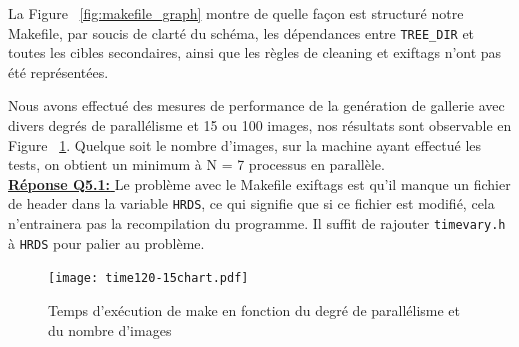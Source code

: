 \documentclass[10.9pt]{article}
\begin{document}
La Figure ~\ref{fig:makefile_graph} montre de quelle façon est
structuré notre Makefile, par soucis de clarté du schéma, les dépendances entre
\lstinline!TREE_DIR! et toutes les cibles secondaires, ainsi que les
règles de cleaning et exiftags n'ont pas été représentées.

Nous avons effectué des mesures de performance de la genération de
gallerie avec divers degrés de parallélisme et 15 ou 100 images, nos
résultats sont observable en Figure ~\ref{fig:time_graph}. 
Quelque soit le nombre d'images, sur la machine ayant effectué les
tests, on obtient un minimum à N = 7 processus en parallèle.\\   

\underline{\textbf{Réponse Q5.1: }}Le problème avec le Makefile
exiftags est qu'il manque un fichier de header dans la variable
\lstinline!HRDS!, ce qui signifie que si ce fichier est modifié, cela
n'entrainera pas la recompilation du programme. Il suffit de rajouter
\lstinline!timevary.h! à \lstinline!HRDS! pour palier au problème.

\begin{figure}[!h]
\begin{center}
  \texttt{[image: time120-15chart.pdf]}
  \caption{Temps d'exécution de make en fonction du degré de
    parallélisme et du nombre d'images}
\end{center}
\label{fig:time_graph}
\end{figure}
\end{document}
